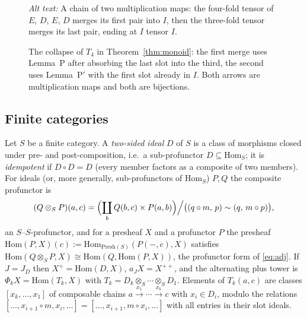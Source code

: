 \documentclass[11pt]{amsart}
\theoremstyle{definition}
\newcommand{\Presh}{\mathrm{Presh}}
\newcommand{\Hom}{\mathrm{Hom}}
\begin{document}
\begin{figure}[ht]
\centering
{}
\caption{The collapse of $T_4$ in Theorem~\ref{thm:monoid}: the first merge
uses Lemma~P after absorbing the last slot into the third, the second uses
Lemma~P$'$ with the first slot already in $I$. Both arrows are multiplication
maps and both are bijections.}
\label{fig:tower}
\par\smallskip\noindent\textit{Alt text:} A chain of two multiplication
maps: the four-fold tensor of $E$, $D$, $E$, $D$ merges its first pair into $I$,
then the three-fold tensor merges its last pair, ending at $I$ tensor $I$.
\end{figure}

\subsection{Finite categories}\label{sub:cat}
Let $S$ be a finite category. A \emph{two-sided ideal} $D$ of $S$ is a class of
morphisms closed under pre- and post-composition, i.e.\ a sub-profunctor
$D\subseteq\Hom_S$; it is \emph{idempotent} if $D\circ D=D$ (every member
factors as a composite of two members). For ideals (or, more generally,
sub-profunctors of $\Hom_S$) $P,Q$ the composite profunctor is
\[
(Q\otimes_SP)(a,c)=\Bigl(\coprod_{b}Q(b,c)\times P(a,b)\Bigr)\Big/\bigl((q\circ m,\,p)\sim(q,\,m\circ p)\bigr),
\]
an $S$--$S$-profunctor, and for a presheaf $X$ and a profunctor $P$ the presheaf
$\Hom(P,X)(c):=\Hom_{\Presh(S)}(P(-,c),X)$ satisfies
$\Hom(Q\otimes_SP,X)\cong\Hom(Q,\Hom(P,X))$, the profunctor form of
\eqref{eq:adj}. If $J=J_D$ then $X^{+}=\Hom(D,X)$, $a_JX=X^{++}$, and the
alternating plus tower is $\Phi_kX=\Hom(T_k,X)$ with $T_k=D_k\otimes_S\cdots\otimes_SD_1$.
Elements of $T_k(a,c)$ are classes $[x_k,\dots,x_1]$ of composable chains
$a\xrightarrow{x_1}\cdots\xrightarrow{x_k}c$ with $x_i\in D_i$, modulo the
relations $[\dots,x_{i+1}\circ m,x_i,\dots]=[\dots,x_{i+1},m\circ x_i,\dots]$
with all entries in their slot ideals.
\end{document}
